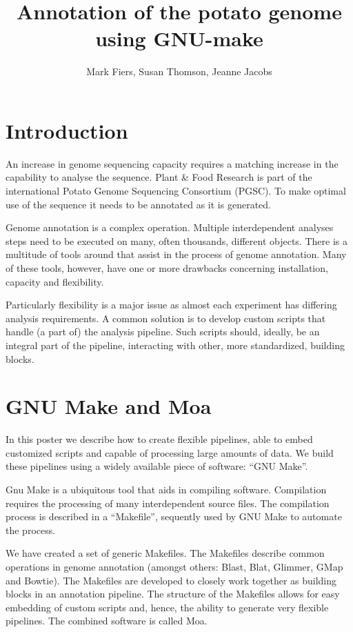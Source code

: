 \documentclass[a4paper,11pt,oneside]{article}
\begin{document}
\title{Annotation of the potato genome using GNU-make}
\author{Mark Fiers, Susan Thomson, Jeanne Jacobs}

\section{Introduction}

An increase in genome sequencing capacity requires a matching increase in
the capability to analyse the sequence. Plant \& Food Research is part
of the international Potato Genome Sequencing Consortium (PGSC). To
make optimal use of the sequence it needs to be annotated as it is
generated. 

Genome annotation is a complex operation. Multiple interdependent
analyses steps need to be executed on many, often thousands, different
objects. There is a multitude of tools around that assist in the
process of genome annotation. Many of these tools, however, have one
or more drawbacks concerning installation, capacity and flexibility.

Particularly flexibility is a major issue as almost each experiment
has differing analysis requirements. A common solution is to develop
custom scripts that handle (a part of) the analysis pipeline. Such
scripts should, ideally, be an integral part of the pipeline,
interacting with other, more standardized, building blocks.

\section{GNU Make and Moa}

In this poster we describe how to create flexible pipelines, able to
embed customized scripts and capable of processing large amounts of
data. We build these pipelines using a widely available piece of
software: ``GNU Make''.

Gnu Make is a ubiquitous tool that aids in compiling software.
Compilation requires the processing of many interdependent source
files. The compilation process is described in a ``Makefile'',
sequently used by GNU Make to automate the process.

We have created a set of generic Makefiles. The Makefiles describe
common operations in genome annotation (amongst others: Blast, Blat,
Glimmer, GMap and Bowtie). The Makefiles are developed to closely work
together as building blocks in an annotation pipeline. The structure
of the Makefiles allows for easy embedding of custom scripts and,
hence, the ability to generate very flexible pipelines. The combined
software is called Moa.
\end{document}
